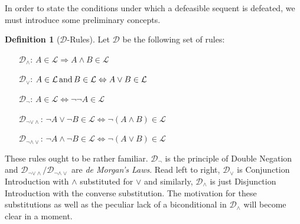 \documentclass{article}
\theoremstyle{definition}
\theoremstyle{definition}
\theoremstyle{definition}
\theoremstyle{definition}
\newtheorem{definition}{Definition}
\theoremstyle{remark}
\theoremstyle{definition}
\theoremstyle{definition}
\begin{document}
In order to state the conditions under which a defeasible sequent is defeated, we must introduce some preliminary concepts.


\begin{definition}[$ \mathcal{D}$-Rules]\label{drules}
	Let $ \mathcal{D}$ be the following set of rules:
	
	\begin{itemize}
		\item[$ \mathcal{D}_{\wedge} $:] $ A \in \mathcal{L} \Rightarrow A \wedge B \in \mathcal{L}  $
		\item[$ \mathcal{D}_{\vee}$:] $A \in \mathcal{L} \text{\,and\,} B \in \mathcal{L}  \Leftrightarrow A \vee B  \in \mathcal{L}  $
		\item[$ \mathcal{D}_\neg$:] $A  \in \mathcal{L} \Leftrightarrow \neg\neg A \in \mathcal{L} $
		\item[$ \mathcal{D}_{\neg\vee\wedge} $:]  $\neg A \vee \neg B \in \mathcal{L}  \Leftrightarrow \neg (A \wedge B) \in \mathcal{L}  $
		\item[$ \mathcal{D}_{\neg\wedge\vee} $:]  $\neg A \wedge \neg B \in \mathcal{L}  \Leftrightarrow \neg (A \vee B) \in \mathcal{L}  $
	\end{itemize}
\end{definition}




These rules ought to be rather familiar. $ \mathcal{D}_\neg$ is the principle of Double Negation and $ \mathcal{D}_{\neg\vee\wedge}/\mathcal{D}_{\neg\wedge\vee} $ are  \textit{de Morgan's Laws}. Read left to right, $ \mathcal{D}_\vee $ is Conjunction Introduction with $ \wedge $ substituted for $ \vee $ and similarly, $ \mathcal{D}_\wedge $ is just Disjunction Introduction with the converse substitution. The motivation for these substitutions as well as the peculiar lack of a biconditional in $ \mathcal{D}_\wedge $ will become clear in a moment. 
\end{document}
